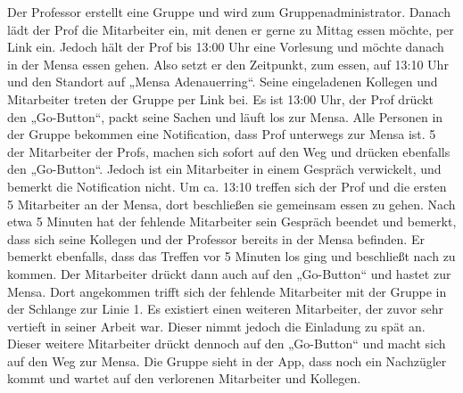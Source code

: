 Der Professor erstellt eine Gruppe und wird zum Gruppenadministrator. Danach lädt der Prof die Mitarbeiter ein, mit denen er gerne zu Mittag essen möchte, per Link ein. Jedoch hält der Prof bis 13:00 Uhr eine Vorlesung und möchte danach in der Mensa essen gehen. Also setzt er den Zeitpunkt, zum essen, auf 13:10 Uhr und den Standort auf „Mensa Adenauerring“. Seine eingeladenen Kollegen und Mitarbeiter treten der Gruppe per Link bei. Es ist 13:00 Uhr, der Prof drückt den „Go-Button“, packt seine Sachen und läuft los zur Mensa. Alle Personen in der Gruppe bekommen eine Notification, dass Prof unterwegs zur Mensa ist. 5 der Mitarbeiter der Profs, machen sich sofort auf den Weg und drücken ebenfalls den „Go-Button“. Jedoch ist ein Mitarbeiter in einem Gespräch verwickelt, und bemerkt die Notification nicht. Um ca. 13:10 treffen sich der Prof und die ersten 5 Mitarbeiter an der Mensa, dort beschließen sie gemeinsam essen zu gehen. Nach etwa 5 Minuten hat der fehlende Mitarbeiter sein Gespräch beendet und bemerkt, dass sich seine Kollegen und der Professor bereits in der Mensa befinden. Er bemerkt ebenfalls, dass das Treffen vor 5 Minuten los ging und beschließt nach zu kommen. Der Mitarbeiter drückt dann auch auf den „Go-Button“ und hastet zur Mensa. Dort angekommen trifft sich der fehlende Mitarbeiter mit der Gruppe in der Schlange zur Linie 1. Es existiert einen weiteren Mitarbeiter, der zuvor sehr vertieft in seiner Arbeit war. Dieser nimmt jedoch die Einladung zu spät an. Dieser weitere Mitarbeiter drückt dennoch auf den „Go-Button“ und macht sich auf den Weg zur Mensa. Die Gruppe sieht in der App, dass noch ein Nachzügler kommt und wartet auf den verlorenen Mitarbeiter und Kollegen.\\